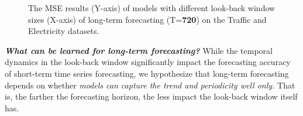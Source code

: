 \documentclass[10pt,twocolumn,letterpaper]{article}
\begin{document}
\begin{figure}[h]	
    \hspace{-0.6cm}
    \hspace{0.6cm}
    \vspace{-0.2cm}
	\caption{The MSE results (Y-axis) of models with different look-back window sizes (X-axis) of long-term forecasting (T=\textbf{720}) on the Traffic and Electricity datasets. } 
	\label{fig:lookBackWindows}  \vspace{-0.2cm}
\end{figure}

\textbf{\emph{What can be learned for long-term forecasting?}}
While the temporal dynamics in the look-back window significantly impact the forecasting accuracy of short-term time series forecasting, we hypothesize that long-term forecasting depends on whether \emph{models can capture the trend and periodicity well only.} That is, the farther the forecasting horizon, the less impact the look-back window itself has.  
\begin{table}[h]
\centering
{}
\vspace{-0.2cm}
\caption{Comparison of different input sequences under the MSE metric to explore what LTSF-Transformers depend on. If the input is \emph{Close}, we use the $96_{th},..., 191_{th}$ time steps as the input sequence. If the input is \emph{Far}, we use the $0_{th},..., 95_{th}$ time steps. Both of them forecast the $192_{th},...,(192+720)_{th}$ time steps. }
\label{tab:Prior}
\vspace{-0.4cm}
\end{table}
\end{document}
